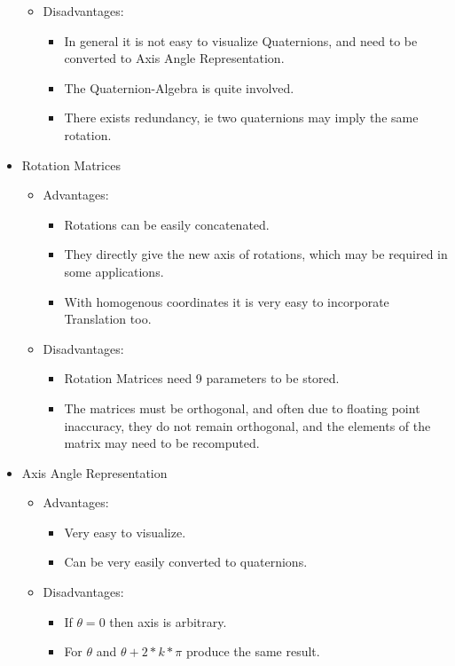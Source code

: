 \message{ !name(cmu_airlab_report.tex)}\documentclass{article}
\begin{document}
\begin{itemize}
\begin{itemize}
  \item Disadvantages:
    \begin{itemize}
    \item In general it is not easy to visualize Quaternions, and need to be converted to Axis Angle Representation.
    \item The Quaternion-Algebra is quite involved.
    \item There exists redundancy, ie two quaternions may imply the same rotation.
    \end{itemize}
  \end{itemize}

\item Rotation Matrices
  \begin{itemize}
  \item Advantages:
    \begin{itemize}
    \item Rotations can be easily concatenated.
    \item They directly give the new axis of rotations, which may be required in some applications.
    \item With homogenous coordinates it is very easy to incorporate Translation too.
    \end{itemize}

  \item Disadvantages:
    \begin{itemize}
    \item Rotation Matrices need 9 parameters to be stored.
    \item The matrices must be orthogonal, and often due to floating point inaccuracy, they do not remain orthogonal, and the elements of the matrix may need to be recomputed.
    \end{itemize}
  \end{itemize}

\item Axis Angle Representation
  \begin{itemize}
  \item Advantages:
    \begin{itemize}
    \item Very easy to visualize.
    \item Can be very easily converted to quaternions.
    \end{itemize}
  \item Disadvantages:
    \begin{itemize}
    \item If $\theta = 0$ then axis is arbitrary.
    \item For $\theta$ and $\theta + 2*k*\pi$ produce the same result.
    \end{itemize}
  \end{itemize}
\end{itemize}
\end{document}
